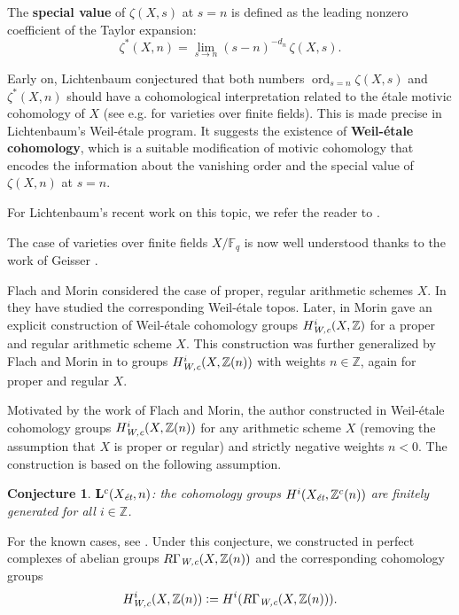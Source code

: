 \documentclass[10pt,a4paper,oneside,draft]{article}
\DeclareMathOperator{\ord}{ord}
\newcommand{\FF}{\mathbb{F}}
\newcommand{\ZZ}{\mathbb{Z}}
\newcommand{\et}{\text{\it \'{e}t}}
\newcommand{\Wc}{\text{\it W,c}}
\newcommand{\dfn}{\mathrel{\mathop:}=}
\theoremstyle{myplain}
\theoremstyle{mydefinition}
\newtheorem*{conjecture*}{Conjecture}
\numberwithin{equation}{section}
\begin{document}
The \textbf{special value} of $\zeta (X,s)$ at $s = n$ is defined as the leading
nonzero coefficient of the Taylor expansion:
$$\zeta^* (X,n) = \lim_{s \to n} (s - n)^{-d_n}\,\zeta (X,s).$$

Early on, Lichtenbaum conjectured that both numbers $\ord_{s = n} \zeta (X,s)$
and $\zeta^* (X,n)$ should have a cohomological interpretation related to the
\'{e}tale motivic cohomology of $X$ (see e.g. \cite{Lichtenbaum-1984} for
varieties over finite fields). This is made precise in Lichtenbaum's
Weil-\'{e}tale program. It suggests the existence of
\textbf{Weil-\'{e}tale cohomology}, which is a suitable modification of motivic
cohomology that encodes the information about the vanishing order and the
special value of $\zeta (X,n)$ at $s = n$.

For Lichtenbaum's recent work on this topic, we refer the reader to
\cite{Lichtenbaum-2005,Lichtenbaum-2009-Euler-char,Lichtenbaum-2009-number-rings,Lichtenbaum-2021}.

The case of varieties over finite fields $X/\FF_q$ is now well understood thanks
to the work of Geisser
\cite{Geisser-2004,Geisser-2006,Geisser-2010-arithmetic-homology}.

Flach and Morin considered the case of proper, regular arithmetic schemes
$X$. In \cite{Flach-Morin-2012} they have studied the corresponding
Weil-\'{e}tale topos. Later, in \cite{Morin-2014} Morin gave an explicit
construction of Weil-\'{e}tale cohomology groups $H^i_\Wc (X, \ZZ)$ for a proper
and regular arithmetic scheme $X$. This construction was further generalized by
Flach and Morin in \cite{Flach-Morin-2018} to groups $H^i_\Wc (X, \ZZ(n))$ with
weights $n \in \ZZ$, again for proper and regular $X$.

Motivated by the work of Flach and Morin, the author constructed in
\cite{Beshenov-Weil-etale-1} Weil-\'{e}tale cohomology groups
$H^i_\Wc (X, \ZZ (n))$ for any arithmetic scheme $X$ (removing the assumption
that $X$ is proper or regular) and strictly negative weights $n < 0$.  The
construction is based on the following assumption.

\begin{conjecture*}
  $\mathbf{L}^c (X_\et,n)$: the cohomology groups $H^i (X_\et, \ZZ^c (n))$ are
  finitely generated for all $i \in \ZZ$.
\end{conjecture*}

For the known cases, see \cite[\S 8]{Beshenov-Weil-etale-1}. Under this
conjecture, we constructed in \cite[\S 7]{Beshenov-Weil-etale-1} perfect
complexes of abelian groups $R\Gamma_\Wc (X, \ZZ(n))$ and the corresponding
cohomology groups
$$H^i_\Wc (X, \ZZ(n)) \dfn H^i (R\Gamma_\Wc (X, \ZZ(n))).$$
\end{document}
